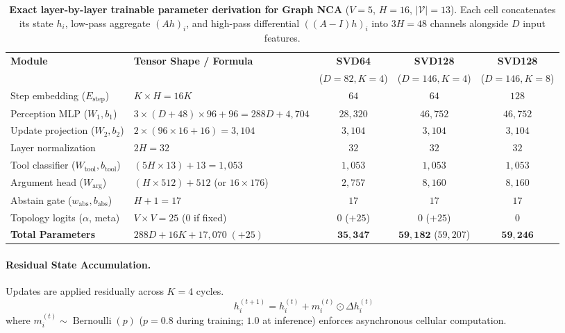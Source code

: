 \documentclass[10pt,twocolumn,letterpaper]{article}
\begin{document}
\begin{table}[tbp]
\centering
\small
\setlength{\tabcolsep}{3pt}
\caption{\textbf{Exact layer-by-layer trainable parameter derivation for Graph NCA} ($V{=}5$, $H{=}16$, $|\mathcal{V}|{=}13$). Each cell concatenates its state $h_i$, low-pass aggregate $(Ah)_i$, and high-pass differential $((A-I)h)_i$ into $3H{=}48$ channels alongside $D$ input features.}
\label{tab:param-derivation}
\vspace{6pt}
\begin{tabular*}{\textwidth}{@{\extracolsep{\fill}}llccc@{}}
\toprule
\textbf{Module} & \textbf{Tensor Shape / Formula} & \textbf{SVD64} & \textbf{SVD128} & \textbf{SVD128} \\
 & & ($D{=}82, K{=}4$) & ($D{=}146, K{=}4$) & ($D{=}146, K{=}8$) \\
\midrule
Step embedding ($E_{\text{step}}$) & $K \times H = 16K$ & $64$ & $64$ & $128$ \\
Perception MLP ($W_1, b_1$) & $3 \times (D{+}48) \times 96 + 96 = 288D + 4{,}704$ & $28{,}320$ & $46{,}752$ & $46{,}752$ \\
Update projection ($W_2, b_2$) & $2 \times (96 \times 16 + 16) = 3{,}104$ & $3{,}104$ & $3{,}104$ & $3{,}104$ \\
Layer normalization & $2H = 32$ & $32$ & $32$ & $32$ \\
Tool classifier ($W_{\text{tool}}, b_{\text{tool}}$) & $(5H \times 13) + 13 = 1{,}053$ & $1{,}053$ & $1{,}053$ & $1{,}053$ \\
Argument head ($W_{\text{arg}}$) & $(H \times 512) + 512$ (or $16\times 176$) & $2{,}757$ & $8{,}160$ & $8{,}160$ \\
Abstain gate ($w_{\text{abs}}, b_{\text{abs}}$) & $H + 1 = 17$ & $17$ & $17$ & $17$ \\
Topology logits ($\alpha$, meta) & $V \times V = 25$ ($0$ if fixed) & $0$ ($+25$) & $0$ ($+25$) & $0$ \\
\midrule
\textbf{Total Parameters} & $288D + 16K + 17{,}070 \; (+25)$ & $\mathbf{35{,}347}$ & $\mathbf{59{,}182}$ ($59{,}207$) & $\mathbf{59{,}246}$ \\
\bottomrule
\end{tabular*}
\end{table}

\paragraph{Residual State Accumulation.}
Updates are applied residually across $K=4$ cycles.
\begin{equation}
  h_i^{(t+1)} = h_i^{(t)} + m_i^{(t)} \odot \Delta h_i^{(t)}
\end{equation}
where $m_i^{(t)} \sim \operatorname{Bernoulli}(p)$ ($p=0.8$ during training; $1.0$ at inference) enforces asynchronous cellular computation.
\end{document}
